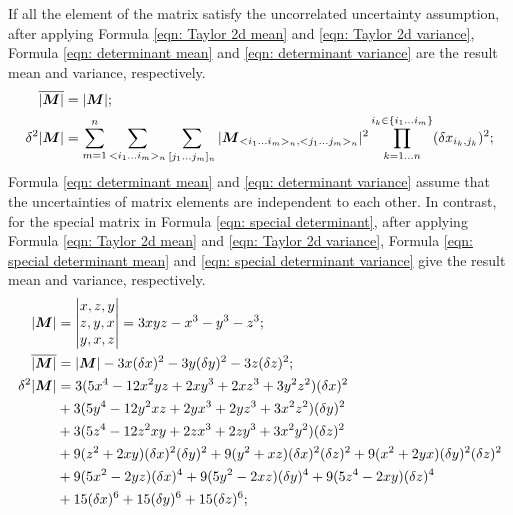 \documentclass[twoside]{article}
\numberwithin{equation}{section}
\begin{document}
If all the element of the matrix satisfy the uncorrelated uncertainty assumption, after applying Formula \eqref{eqn: Taylor 2d mean} and \eqref{eqn: Taylor 2d variance}, Formula \eqref{eqn: determinant mean} and \eqref{eqn: determinant variance} are the result mean and variance, respectively.
\begin{align}
\label{eqn: determinant mean}
\overline{|\protect{\textrm{\boldmath $M$}}|} &= |\protect{\textrm{\boldmath $M$}}|; \\
\label{eqn: determinant variance}
\delta^2 |\protect{\textrm{\boldmath $M$}}| &= \sum_{m=1}^{n} \sum_{<i_1 \dots i_m>_n} \sum_{[j_1 \dots j_m]_n}
  	|\protect{\textrm{\boldmath $M$}} _{<i_1 \dots i_m>_n, <j_1 \dots j_m>_n}|^2 \prod _{k=1 \dots n}^{i_k \in \{i_1 \dots i_m\}} (\delta x_{i_k, j_k})^2; 
\end{align}
Formula \eqref{eqn: determinant mean} and \eqref{eqn: determinant variance} assume that the uncertainties of matrix elements are independent to each other.
In contrast, for the special matrix in Formula \eqref{eqn: special determinant}, after applying Formula \eqref{eqn: Taylor 2d mean} and \eqref{eqn: Taylor 2d variance}, Formula \eqref{eqn: special determinant mean} and \eqref{eqn: special determinant variance} give the result mean and variance, respectively. 
\begin{align}
\label{eqn: special determinant}
|\protect{\textrm{\boldmath $M$}}| &= \left| \begin{matrix} x, z, y \\ z, y, x \\ y, x, z \end{matrix} \right| = 3 x y z - x^3 - y^3 - z^3; \\
\label{eqn: special determinant mean}
\overline{|\protect{\textrm{\boldmath $M$}}|} &= |\protect{\textrm{\boldmath $M$}}| - 3 x (\delta x)^2 - 3 y (\delta y)^2 - 3 z (\delta z)^2; \\
\label{eqn: special determinant variance}
\delta^2 |\protect{\textrm{\boldmath $M$}}| &= 3 (5 x^4 - 12 x^2 y z + 2 x y^3 + 2 x z^3 + 3 y^2 z^2)(\delta x)^2 \\
 	&+ 3 (5 y^4 - 12 y^2 x z + 2 y x^3 + 2 y z^3 + 3 x^2 z^2)(\delta y)^2 \nonumber \\
 	&+ 3 (5 z^4 - 12 z^2 x y + 2 z x^3 + 2 z y^3 + 3 x^2 y^2)(\delta z)^2 \nonumber \\
 	&+ 9 (z^2 + 2 x y)(\delta x)^2 (\delta y)^2 + 9 (y^2 + x z) (\delta x)^2 (\delta z)^2 + 9 (x^2 +2 y x) (\delta y)^2 (\delta z)^2 \nonumber \\
 	&+ 9 (5 x^2 - 2 y z) (\delta x)^4 + 9 (5 y^2 - 2 x z) (\delta y)^4 + 9 (5z^4 - 2 x y) (\delta z)^4 \nonumber \\
    &+ 15 (\delta x)^6 + 15 (\delta y)^6 + 15 (\delta z)^6 \nonumber;
\end{align}
\end{document}
